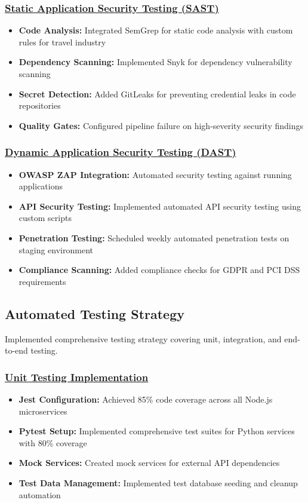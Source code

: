\subsubsection*{\underline{Static Application Security Testing (SAST)}}
\begin{itemize}
    \item \textbf{Code Analysis:} Integrated SemGrep for static code analysis with custom rules for travel industry
    \item \textbf{Dependency Scanning:} Implemented Snyk for dependency vulnerability scanning
    \item \textbf{Secret Detection:} Added GitLeaks for preventing credential leaks in code repositories
    \item \textbf{Quality Gates:} Configured pipeline failure on high-severity security findings
\end{itemize}

\subsubsection*{\underline{Dynamic Application Security Testing (DAST)}}
\begin{itemize}
    \item \textbf{OWASP ZAP Integration:} Automated security testing against running applications
    \item \textbf{API Security Testing:} Implemented automated API security testing using custom scripts
    \item \textbf{Penetration Testing:} Scheduled weekly automated penetration tests on staging environment
    \item \textbf{Compliance Scanning:} Added compliance checks for GDPR and PCI DSS requirements
\end{itemize}

\subsection{Automated Testing Strategy}
Implemented comprehensive testing strategy covering unit, integration, and end-to-end testing.

\subsubsection*{\underline{Unit Testing Implementation}}
\begin{itemize}
    \item \textbf{Jest Configuration:} Achieved 85\% code coverage across all Node.js microservices
    \item \textbf{Pytest Setup:} Implemented comprehensive test suites for Python services with 80\% coverage
    \item \textbf{Mock Services:} Created mock services for external API dependencies
    \item \textbf{Test Data Management:} Implemented test database seeding and cleanup automation
\end{itemize}

